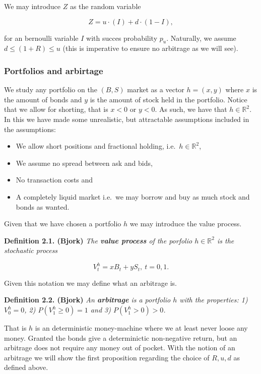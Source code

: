 \documentclass[
]{book}
\providecommand{\tightlist}{%
  \setlength{\itemsep}{0pt}\setlength{\parskip}{0pt}}
\begin{document}
We may introduce \(Z\) as the random variable

\[
Z=u\cdot (I)+d\cdot (1-I),
\]

for an bernoulli variable \(I\) with succes probability \(p_u\). Naturally, we assume \(d\le (1+R)\le u\) (this is imperative to ensure no arbitrage as we will see).

\hypertarget{portfolios-and-arbirtage}{%
\subsubsection{Portfolios and arbirtage}\label{portfolios-and-arbirtage}}

We study any portfolio on the \((B,S)\) market as a vector \(h=(x,y)\) where \(x\) is the amount of bonds and \(y\) is the amount of stock held in the portfolio. Notice that we allow for shorting, that is \(x<0\) or \(y<0\). As such, we have that \(h\in \mathbb{R}^2\). In this we have made some unrealistic, but attractable assumptions included in the assumptions:

\begin{itemize}
\tightlist
\item
  We allow short positions and fractional holding, i.e.~\(h\in \mathbb{R}^2\),
\item
  We assume no spread between ask and bids,
\item
  No transaction costs and
\item
  A completely liquid market i.e.~we may borrow and buy as much stock and bonds as wanted.
\end{itemize}

Given that we have chosen a portfolio \(h\) we may introduce the value process.

\textbf{Definition 2.1. (Bjork)} \emph{The \textbf{value process} of the porfolio \(h\in\mathbb{R}^2\) is the stochastic process}

\[V^h_t=xB_t+yS_t,\ t=0,1.\]

Given this notation we may define what an arbitrage is.

\textbf{Definition 2.2. (Bjork)} \emph{An \textbf{arbitrage} is a portfolio \(h\) with the properties: 1) \(V^h_0=0\), 2) \(P(V^h_1\ge 0)=1\) and 3) \(P(V^h_1>0)>0\).}

That is \(h\) is an deterministic money-machine where we at least never loose any money. Granted the bonds give a determinictic non-negative return, but an arbitrage does not require any money out of pocket. With the notion of an arbitrage we will show the first proposition regarding the choice of \(R,u,d\) as defined above.
\end{document}

